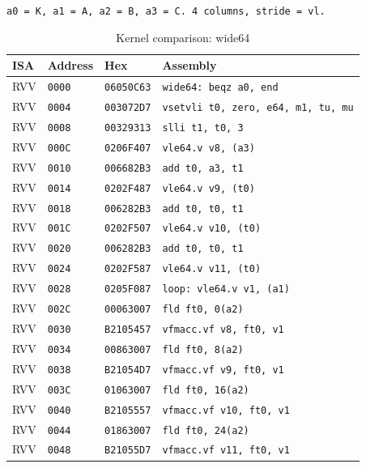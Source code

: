 \begin{table}[htbp]
\centering
\caption{Kernel comparison: wide64}
\begingroup
\scriptsize
\setlength{\tabcolsep}{4pt}
\noindent \texttt{a0 = K, a1 = A, a2 = B, a3 = C. 4 columns, stride = vl.}\par
\vspace{0.6ex}
\begin{tabular}{@{}l|l|l|p{7.2cm}@{}}
\toprule
ISA & Address & Hex & Assembly \\
\midrule
RVV & \texttt{0000} & \texttt{06050C63} & \texttt{wide64: beqz a0, end} \\
RVV & \texttt{0004} & \texttt{003072D7} & \texttt{vsetvli t0, zero, e64, m1, tu, mu} \\
RVV & \texttt{0008} & \texttt{00329313} & \texttt{slli t1, t0, 3} \\
RVV & \texttt{000C} & \texttt{0206F407} & \texttt{vle64.v v8, (a3)} \\
RVV & \texttt{0010} & \texttt{006682B3} & \texttt{add t0, a3, t1} \\
RVV & \texttt{0014} & \texttt{0202F487} & \texttt{vle64.v v9, (t0)} \\
RVV & \texttt{0018} & \texttt{006282B3} & \texttt{add t0, t0, t1} \\
RVV & \texttt{001C} & \texttt{0202F507} & \texttt{vle64.v v10, (t0)} \\
RVV & \texttt{0020} & \texttt{006282B3} & \texttt{add t0, t0, t1} \\
RVV & \texttt{0024} & \texttt{0202F587} & \texttt{vle64.v v11, (t0)} \\
RVV & \texttt{0028} & \texttt{0205F087} & \texttt{loop: vle64.v v1, (a1)} \\
RVV & \texttt{002C} & \texttt{00063007} & \texttt{fld ft0, 0(a2)} \\
RVV & \texttt{0030} & \texttt{B2105457} & \texttt{vfmacc.vf v8, ft0, v1} \\
RVV & \texttt{0034} & \texttt{00863007} & \texttt{fld ft0, 8(a2)} \\
RVV & \texttt{0038} & \texttt{B21054D7} & \texttt{vfmacc.vf v9, ft0, v1} \\
RVV & \texttt{003C} & \texttt{01063007} & \texttt{fld ft0, 16(a2)} \\
RVV & \texttt{0040} & \texttt{B2105557} & \texttt{vfmacc.vf v10, ft0, v1} \\
RVV & \texttt{0044} & \texttt{01863007} & \texttt{fld ft0, 24(a2)} \\
RVV & \texttt{0048} & \texttt{B21055D7} & \texttt{vfmacc.vf v11, ft0, v1} \\

\end{tabular}
\end{table}
